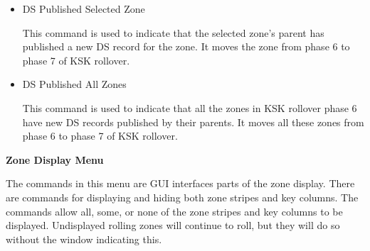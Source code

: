 \begin{itemize}

\item DS Published Selected Zone\verb" "

This command is used to indicate that the selected zone's parent has published
a new DS record for the zone.  It moves the zone from phase 6 to phase 7 of
KSK rollover.

\item DS Published All Zones\verb" "

This command is used to indicate that all the zones in KSK rollover phase 6
have new DS records published by their parents.  It moves all these zones from
phase 6 to phase 7 of KSK rollover.

\end{itemize}

{\bf Zone Display Menu}

The commands in this menu are GUI interfaces parts of the zone display.  There
are commands for displaying and hiding both zone stripes and key columns.  The
commands allow all, some, or none of the zone stripes and key columns to be
displayed.  Undisplayed rolling zones will continue to roll, but they will do
so without the  window indicating this.

